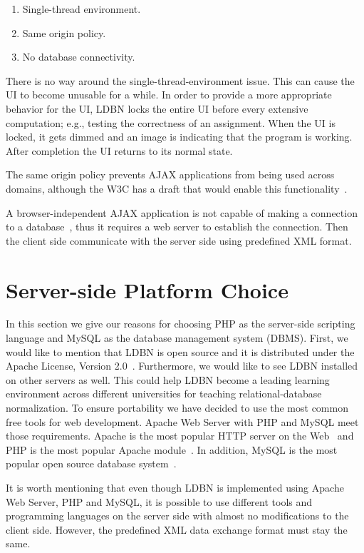 \begin{enumerate}
	\item Single-thread environment.
	\item Same origin policy.
	\item No database connectivity.
\end{enumerate}

There is no way around the single-thread-environment issue. This can cause the UI
to become unusable for a while. In order to provide a more appropriate behavior 
for the UI, LDBN locks the entire UI before every extensive computation; e.g.,
testing the correctness of an assignment. When the UI is locked,
it gets dimmed and an image is indicating that the program is working. After 
completion the UI returns to its normal state. 

The same origin policy prevents AJAX applications from being used across domains,
although the W3C has a draft that would enable this functionality~\cite{bajax1}.

A browser-independent AJAX application is not capable of making a connection 
to a database~\cite{bajax1}, thus it requires a web server to establish the 
connection. Then the client side communicate with the server side using 
predefined XML format.

\section{Server-side Platform Choice}
In this section we give our reasons for choosing PHP as the server-side
scripting language and MySQL as the database management system (DBMS). First, we would
like to mention that LDBN is open source and it is distributed under the 
Apache License, Version 2.0~\cite{walv2}. Furthermore, we would like to see 
LDBN installed on other servers as well. This could help LDBN become
a leading learning environment across 
different universities for teaching relational-database normalization. To ensure 
portability we have decided to use the most common free 
tools for web development. Apache Web Server with PHP and MySQL meet those requirements. 
Apache is the most popular HTTP server on the Web~\cite{w3} and PHP is the most popular 
Apache module~\cite{w4}. In addition, MySQL is the most popular open source 
database system~\cite{w5}.
 
It is worth mentioning that even though LDBN is implemented using Apache Web Server,
PHP and MySQL, it is possible to use different tools and programming languages 
on the server side with almost no modifications to the client side. However, 
the predefined XML data exchange format must stay the same.

